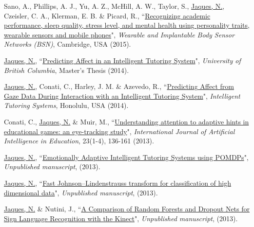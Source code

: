 \documentclass[paper=letter,fontsize=11pt]{scrartcl} %
\newcommand{\PaperEntry}[6]{
		\noindent #1, ``\href{#6}{#2}", \textit{#3}, #4 (#5).}
\begin{document}
\begin{etaremune}
\item \PaperEntry{Sano, A., Phillips, A. J., Yu, A. Z., McHill, A. W., Taylor, S., \underline{Jaques, N.}, Czeisler, C. A., Klerman, E. B. \& Picard, R.}{Recognizing academic performance, sleep quality, stress level, and mental health using personality traits, wearable sensors and mobile phones}{Wearable and Implantable Body Sensor Networks (BSN)}{Cambridge, USA}{2015}{https://www.ncbi.nlm.nih.gov/pmc/articles/PMC5431072/}

\item \PaperEntry{\underline{Jaques, N.}}{Predicting Affect in an Intelligent Tutoring System}{University of British Columbia}{Master's Thesis}{2014}{https://open.library.ubc.ca/collections/ubctheses/24/items/1.0135541}

\item \PaperEntry{\underline{Jaques, N.}, Conati, C., Harley, J. M. \& Azevedo, R.}{Predicting Affect from Gaze Data During Interaction with an Intelligent Tutoring System}{Intelligent Tutoring Systems}{Honolulu, USA}{2014}{http://www.cs.ubc.ca/~conati/my-papers/ITS-Natasha-2014.pdf}

\item \PaperEntry{Conati, C., \underline{Jaques, N.} \& Muir, M.}{Understanding attention to adaptive hints in educational games: an eye-tracking study}{International Journal of Artificial Intelligence in Education}{23(1-4), 136-161}{2013}{https://link.springer.com/article/10.1007/s40593-013-0002-8}

\item \PaperEntry{\underline{Jaques, N.}}{Emotionally Adaptive Intelligent Tutoring Systems using POMDPs}{Unpublished manuscript}{}{2013}{https://drive.google.com/file/d/1oKVJwaU0hwSeu1oUWQSH9W29eUj-j_gm/view?usp=sharing}

\item \PaperEntry{\underline{Jaques, N.}}{Fast Johnson–Lindenstrauss transform for classification of high dimensional data}{Unpublished manuscript}{}{2013}{https://drive.google.com/file/d/1qBSWgePvclrjiQMVz2ir4w8wM1cqNU__/view?usp=sharing}

\item \PaperEntry{\underline{Jaques, N.} \& Nutini, J.}{A Comparison of Random Forests and Dropout Nets for Sign Language Recognition with the Kinect}{Unpublished manuscript}{}{2013}{https://drive.google.com/file/d/1F9X_xhKUYDJwuz9Eql548OlRpUW1M63X/view?usp=sharing}

\end{etaremune}
\end{document}
